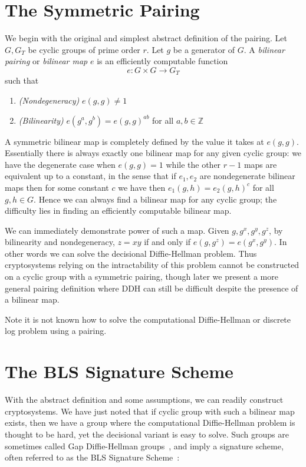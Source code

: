 \section{\label{sec:symmetricpairing}The Symmetric Pairing}

We begin with the original and simplest abstract definition of the pairing.
Let $G, G_T$ be cyclic groups of prime order $r$.
Let $g$ be a generator of $G$.
A \emph{bilinear pairing} or \emph{bilinear map}
$e$ is an efficiently computable function
\[
e:G \times G \rightarrow G_T
\]
such that
\begin{enumerate}
\item
\emph{(Nondegeneracy)}
$e(g,g) \ne 1$
\item
\emph{(Bilinearity)}
$e(g^a, g^b) = e(g,g)^{a b}$ for all $a, b \in \mathbb{Z}$
\end{enumerate}

A symmetric bilinear map is completely defined by the value it
takes at $e(g,g)$. Essentially there is always exactly one bilinear map
for any given cyclic group:
we have the degenerate case when $e(g,g)=1$
while the other $r-1$ maps are
equivalent up to a constant,
in the sense that if $e_1, e_2$ are nondegenerate bilinear maps then for
some constant $c$ we have
then $e_1(g,h) = e_2(g,h)^c$ for all $g,h \in G$.
Hence we can always find a bilinear map for any cyclic group;
the difficulty lies in finding an efficiently computable bilinear map.

We can immediately demonstrate power of such a map. Given
$g, g^x, g^y, g^z$, by bilinearity and nondegeneracy,
$z = x y$ if and only if
$e(g, g^z) = e(g^x, g^y)$. In other words we can solve the decisional
Diffie-Hellman problem. Thus cryptosystems relying on the intractability of
this problem cannot be constructed on a cyclic group with a symmetric pairing,
though later we present a more general pairing definition where DDH can still
be difficult despite the presence of a bilinear map.

Note it is not known how to solve the computational Diffie-Hellman
or discrete log problem using a pairing.

\section{The BLS Signature Scheme}

With the abstract definition and some assumptions, we can readily construct
cryptosystems. We have just noted that if cyclic group with such a bilinear map
exists, then we have a group where the computational Diffie-Hellman problem is
thought to be hard, yet the decisional variant is easy to solve. Such groups
are sometimes called Gap Diffie-Hellman groups~\cite{op}, and imply a signature
scheme, often referred to as the BLS Signature Scheme~\cite{bls}:


